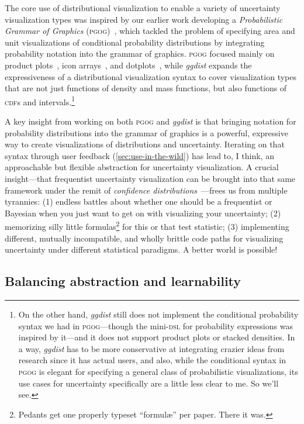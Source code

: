 \documentclass[journal]{vgtc}                     %
\begin{document}
The core use of distributional visualization to enable a variety of uncertainty visualization types was inspired by our earlier work developing a \textit{Probabilistic Grammar of Graphics} (\textsc{pgog})~\cite{pu2020probabilistic}, which tackled the problem of specifying area and unit visualizations of conditional probability distributions by integrating probability notation into the grammar of graphics. \textsc{pgog} focused mainly on product plots~\cite{wickham2011product}, icon arrays~\cite{ancker2006design}, and dotplots~\cite{wilkinson1999dot}, while \textit{ggdist} expands the expressiveness of a distributional visualization syntax to cover visualization types that are not just functions of density and mass functions, but also functions of \textsc{cdf}s and intervals.\footnote{On the other hand, \textit{ggdist} still does not implement the conditional probability syntax we had in \textsc{pgog}---though the mini-\textsc{dsl} for probability expressions was inspired by it---and it does not support product plots or stacked densities. In a way, \textit{ggdist} has to be more conservative at integrating crazier ideas from research since it has actual users, and also, while the conditional syntax in \textsc{pgog} is elegant for specifying a general class of probabilistic visualizations, its use cases for uncertainty specifically are a little less clear to me. So we'll see.} 

A key insight from working on both \textsc{pgog} and \textit{ggdist} is that bringing notation for probability distributions into the grammar of graphics is a powerful, expressive way to create visualizations of distributions and uncertainty. Iterating on that syntax through user feedback 
(\cref{sec:use-in-the-wild}) has lead to, I think, an approachable but flexible abstraction for uncertainty visualization. A crucial insight---that frequentist uncertainty visualization can be brought into that same framework under the remit of \textit{confidence distributions}~\cite{xie2013confidence}---frees us from multiple tyrannies: (1) endless battles about whether one should be a frequentist or Bayesian when you just want to get on with visualizing your uncertainty; (2) memorizing silly little formulas\footnote{Pedants get one properly typeset ``formul\ae'' per paper. There it was.} for this or that test statistic; (3) implementing different, mutually incompatible, and wholly brittle code paths for visualizing uncertainty under different statistical paradigms. A better world is possible!

\subsection{Balancing abstraction and learnability}
\end{document}
